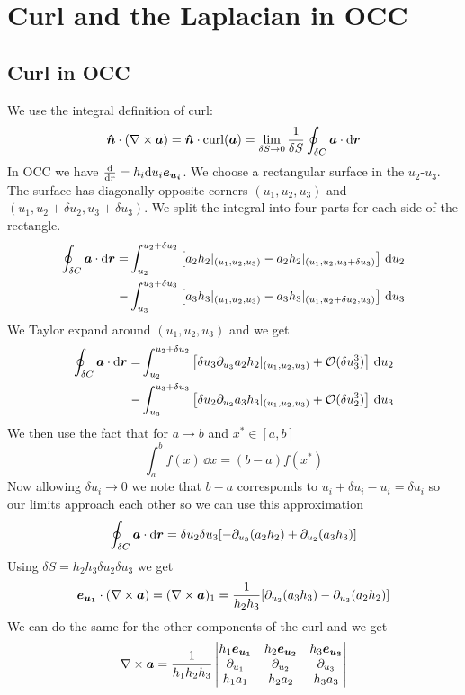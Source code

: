\documentclass{article}
\newcommand{\curlword}{\mathop{\mathrm{curl}}}
\begin{document}
    \section{Curl and the Laplacian in OCC}
    \subsection{Curl in OCC}
    We use the integral definition of curl:
    \[\vh n \cdot (\curl\vv a) = \vh n\cdot\curlword(\vv a) = \lim_{\delta S\to 0}\frac{1}{\delta S}\oint_{\delta C}\vv a\cdot\dd\vv r\]
    In OCC we have \(\dv r = h_i\dd u_i\bm{e_{u_i}}\).
    We choose a rectangular surface in the \(u_2\)-\(u_3\).
    The surface has diagonally opposite corners \((u_1, u_2, u_3)\) and \((u_1, u_2 + \delta u_2, u_3 + \delta u_3)\).
    We split the integral into four parts for each side of the rectangle.
    \begin{align*}
        \oint_{\delta C}\bm{a}\cdot\dd\bm{r} = &\int_{u_2}^{u_2 + \delta u_2} \left[a_2h_2|_{(u_1, u_2, u_3)} - a_2h_2|_{(u_1, u_2, u_3 + \delta u_3)}\right]\,\dd u_2\\
        - &\int_{u_3}^{u_3 + \delta u_3}\left[a_3h_3|_{(u_1, u_2, u_3)} - a_3h_3|_{(u_1, u_2 + \delta u_2, u_3)}\right]\,\dd u_3
    \end{align*}
    We Taylor expand around \((u_1, u_2, u_3)\) and we get
    \begin{align*}
        \oint_{\delta C}\bm{a}\cdot\dd\bm{r} = &\int_{u_2}^{u_2 + \delta u_2}\left[\delta u_3\partial_{u_3}a_2h_2|_{(u_1, u_2, u_3)} + \mathcal{O}(\delta u_3^3)\right]\,\dd u_2\\
        - &\int_{u_3}^{u_3 + \delta u_3}\left[\delta u_2\partial_{u_2}a_3h_3|_{(u_1, u_2, u_3)} + \mathcal{O}(\delta u_2^3)\right]\,\dd u_3
    \end{align*}
    We then use the fact that for \(a\to b\) and \(x^*\in[a, b]\)
    \[\int_a^b f(x)\,\dd x = (b - a)f(x^*)\]
    Now allowing \(\delta u_i\to 0\) we note that \(b-a\) corresponds to \(u_i + \delta u_i - u_i = \delta u_i\) so our limits approach each other so we can use this approximation
    \[\oint_{\delta C}\bm{a}\cdot\dd\bm{r} = \delta u_2\delta u_3[-\partial_{u_3}(a_2h_2) + \partial_{u_2}(a_3h_3)]\]
    Using \(\delta S = h_2h_3\delta u_2\delta u_3\) we get
    \[\bm{e_{u_1}} \cdot (\nabla\times\bm{a}) = (\nabla\times\bm{a})_1 = \frac{1}{h_2h_3}[\partial_{u_2}(a_3h_3) - \partial_{u_3}(a_2h_2)]\]
    We can do the same for the other components of the curl and we get
    \[
        \nabla\times\bm{a} = \frac{1}{h_1h_2h_3}
        \begin{vmatrix}
            h_1\bm{e_{u_1}} & h_2\bm{e_{u_2}} & h_3\bm{e_{u_3}}\\
            \partial_{u_1} & \partial_{u_2} & \partial_{u_3}\\
            h_1 a_1 & h_2 a_2 & h_3 a_3
        \end{vmatrix}
    \]
\end{document}
